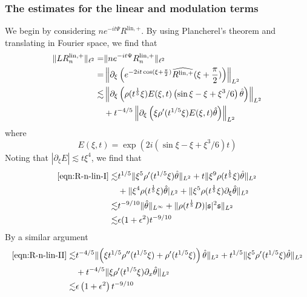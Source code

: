 \documentclass[letterpaper, reqno,final]{amsart}
\newcommand{\fs}{\mathfrak{s}}
\newcommand{\fhPi}{\frac{\pi}{2}}
\newcommand{\SSCutoff}[1][\xi]{\rho(t^\frac{1}{5} #1)}
\newcommand{\discrAvg}{\Psi}
\newcommand{\invLinProp}[1][t]{e^{-i#1\discrAvg}}
\begin{document}
\subsubsection{The estimates for the linear and modulation terms}  We begin by considering $n\invLinProp[t]R^{\text{lin},+}$.  By using Plancherel's theorem and translating in Fourier space, we find that
\begin{subequations}\begin{align}
    \lVert L R_n^{\text{lin},+} \rVert_{\ell^2} =& \lVert n \invLinProp  R_n^{\text{lin},+} \rVert_{\ell^2}\notag\\
    =& \left\lVert \partial_\xi\left( e^{-2it\cos(\xi + \fhPi)} \widehat{R^{\text{lin},+}}(\xi + \fhPi)\right) \right\rVert_{L^2}\nonumber\\
    \lesssim& \left\lVert \partial_{\xi} \left( \SSCutoff E(\xi,t) \left(\sin \xi - \xi + \xi^3 /6\right) \hat{\theta}\right) \right\rVert_{L^2}\label{eqn:R-n-lin-I}\\
    &+ t^{-4/5}\left\lVert \partial_{\xi} \left( \xi \rho'(t^{1/5} \xi) E(\xi,t) \hat{\theta}\right) \right\rVert_{L^2}\label{eqn:R-n-lin-II}
\end{align}\end{subequations}
where 
\begin{equation*}
    E(\xi,t) = \exp\left(2i \left(\sin \xi - \xi + \xi^3/6 \right) t\right)
\end{equation*}  Noting that $|\partial_\xi E| \lesssim t \xi^4$, we find that 
\begin{equation*}\begin{split}
    \eqref{eqn:R-n-lin-I} \lesssim& t^{1/5} \lVert \xi^5 \rho'(t^{1/5} \xi) \hat{\theta} \rVert_{L^2} + t \lVert \xi^9 \SSCutoff \hat{\theta}\rVert_{L^2}\\
    &+ \lVert \xi^4 \SSCutoff \hat{\theta} \rvert_{L^2} + \lVert \xi^5 \SSCutoff \partial_\xi \hat{\theta} \rVert_{L^2}\\
    \lesssim& t^{-9/10} \lVert \hat{\theta} \rVert_{L^\infty} + \lVert \SSCutoff[D] |\fs|^2\fs \rVert_{L^2}\\
    \lesssim& \epsilon(1 + \epsilon^2)t^{-9/10}
\end{split}\end{equation*}
By a similar argument
\begin{equation*}\begin{split}
    \eqref{eqn:R-n-lin-II} \lesssim& t^{-4/5} \lVert \left(\xi t^{1/5} \rho''(t^{1/5} \xi) + \rho'(t^{1/5} \xi)\right) \hat{\theta} \rVert_{L^2} + t^{{1/5}} \lVert \xi^5 \rho'(t^{1/5} \xi) \hat{\theta} \rVert_{L^2}\\
    &+ t^{-4/5} \lVert \xi \rho'(t^{1/5} \xi) \partial_x \hat{\theta} \rVert_{L^2}\\
    \lesssim& \epsilon\left(1 + \epsilon^2 \right) t^{-9/10}
\end{split}\end{equation*}
\end{document}
